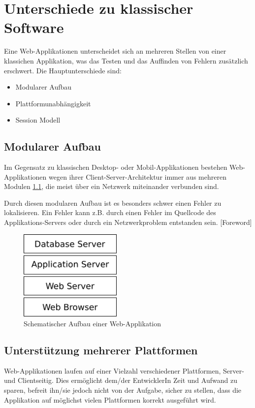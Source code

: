 \documentclass[a4paper,bibtotoc,oneside]{scrbook}
\begin{document}
\chapter{Unterschiede zu klassischer Software}
Eine Web-Applikationen unterscheidet sich an mehreren Stellen von einer klassichen Applikation, was das Testen und das Auffinden von Fehlern zusätzlich erschwert. Die Hauptunterschiede sind:

\begin{itemize}
	\item Modularer Aufbau
	\item Plattformunabhängigkeit
	\item Session Modell
\end{itemize}


\section{Modularer Aufbau}

Im Gegensatz zu klassischen Desktop- oder Mobil-Applikationen bestehen Web-Applikationen wegen ihrer Client-Server-Architektur immer aus mehreren Modulen \ref{Abb3}, die meist über ein Netzwerk miteinander verbunden sind.

Durch diesen modularen Aufbau ist es besonders schwer einen Fehler zu lokalisieren. Ein Fehler kann z.B. durch einen Fehler im Quellcode des Applikations-Servers oder durch ein Netzwerkproblem entstanden sein. \cite{testing_apps_on_web}[Foreword]

\begin{figure}[h!]
\centering
\includegraphics[width=50mm]{img/webstack.png}
\caption[Schematischer Aufbau einer Web-Applikation]{Schematischer Aufbau einer Web-Applikation}\label{Abb3}
\end{figure}

\section{Unterstützung mehrerer Plattformen}
Web-Applikationen laufen auf einer Vielzahl verschiedener Plattformen, Server- und Clientseitig. Dies ermöglicht dem/der EntwicklerIn Zeit und Aufwand zu sparen, befreit ihn/sie jedoch nicht von der Aufgabe, sicher zu stellen, dass die Applikation auf möglichst vielen Plattformen korrekt ausgeführt wird.
\end{document}
